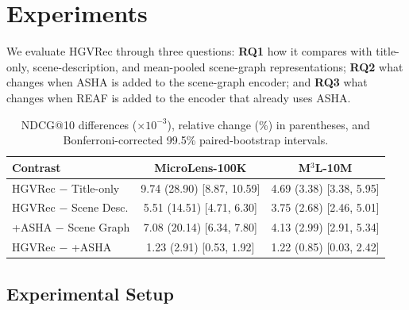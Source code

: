 \section{Experiments}
\label{sec:experiments}
We evaluate HGVRec through three questions: \textbf{RQ1} how it compares with title-only, scene-description, and mean-pooled scene-graph representations; \textbf{RQ2} what changes when ASHA is added to the scene-graph encoder; and \textbf{RQ3} what changes when REAF is added to the encoder that already uses ASHA.

\begin{table}[t]
  \caption{NDCG@10 differences ($\times10^{-3}$), relative change (\%) in parentheses, and Bonferroni-corrected 99.5\% paired-bootstrap intervals.}
  \label{tab:contrasts}
  \centering
  \footnotesize
  \setlength{\tabcolsep}{3pt}
  \begin{tabular}{@{}lcc@{}}
    \toprule
    Contrast & MicroLens-100K & M$^3$L-10M \\
    \midrule
    HGVRec $-$ Title-only & 9.74 (28.90) [8.87, 10.59] & 4.69 (3.38) [3.38, 5.95] \\
    HGVRec $-$ Scene Desc. & 5.51 (14.51) [4.71, 6.30] & 3.75 (2.68) [2.46, 5.01] \\
    +ASHA $-$ Scene Graph & 7.08 (20.14) [6.34, 7.80] & 4.13 (2.99) [2.91, 5.34] \\
    HGVRec $-$ +ASHA & 1.23 (2.91) [0.53, 1.92] & 1.22 (0.85) [0.03, 2.42] \\
    \bottomrule
  \end{tabular}
\end{table}

\subsection{Experimental Setup}
\label{sec:experimental-setup}
